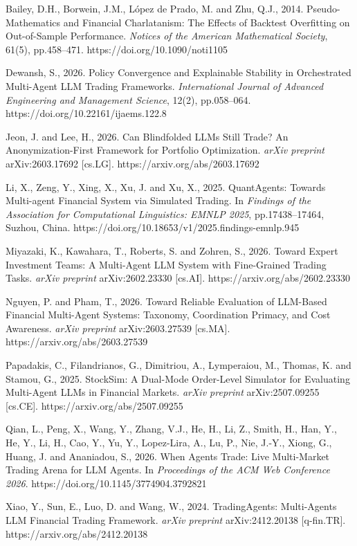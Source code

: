 \documentclass[
]{article}
\begin{document}
Bailey, D.H., Borwein, J.M., López de Prado, M. and Zhu, Q.J., 2014.
Pseudo-Mathematics and Financial Charlatanism: The Effects of Backtest
Overfitting on Out-of-Sample Performance. \emph{Notices of the American
Mathematical Society}, 61(5), pp.458--471.
https://doi.org/10.1090/noti1105

Dewansh, S., 2026. Policy Convergence and Explainable Stability in
Orchestrated Multi-Agent LLM Trading Frameworks. \emph{International
Journal of Advanced Engineering and Management Science}, 12(2),
pp.058--064. https://doi.org/10.22161/ijaems.122.8

Jeon, J. and Lee, H., 2026. Can Blindfolded LLMs Still Trade? An
Anonymization-First Framework for Portfolio Optimization. \emph{arXiv
preprint} arXiv:2603.17692 {[}cs.LG{]}. https://arxiv.org/abs/2603.17692

Li, X., Zeng, Y., Xing, X., Xu, J. and Xu, X., 2025. QuantAgents:
Towards Multi-agent Financial System via Simulated Trading. In
\emph{Findings of the Association for Computational Linguistics: EMNLP
2025}, pp.17438--17464, Suzhou, China.
https://doi.org/10.18653/v1/2025.findings-emnlp.945

Miyazaki, K., Kawahara, T., Roberts, S. and Zohren, S., 2026. Toward
Expert Investment Teams: A Multi-Agent LLM System with Fine-Grained
Trading Tasks. \emph{arXiv preprint} arXiv:2602.23330 {[}cs.AI{]}.
https://arxiv.org/abs/2602.23330

Nguyen, P. and Pham, T., 2026. Toward Reliable Evaluation of LLM-Based
Financial Multi-Agent Systems: Taxonomy, Coordination Primacy, and Cost
Awareness. \emph{arXiv preprint} arXiv:2603.27539 {[}cs.MA{]}.
https://arxiv.org/abs/2603.27539

Papadakis, C., Filandrianos, G., Dimitriou, A., Lymperaiou, M., Thomas,
K. and Stamou, G., 2025. StockSim: A Dual-Mode Order-Level Simulator for
Evaluating Multi-Agent LLMs in Financial Markets. \emph{arXiv preprint}
arXiv:2507.09255 {[}cs.CE{]}. https://arxiv.org/abs/2507.09255

Qian, L., Peng, X., Wang, Y., Zhang, V.J., He, H., Li, Z., Smith, H.,
Han, Y., He, Y., Li, H., Cao, Y., Yu, Y., Lopez-Lira, A., Lu, P., Nie,
J.-Y., Xiong, G., Huang, J. and Ananiadou, S., 2026. When Agents Trade:
Live Multi-Market Trading Arena for LLM Agents. In \emph{Proceedings of
the ACM Web Conference 2026}. https://doi.org/10.1145/3774904.3792821

Xiao, Y., Sun, E., Luo, D. and Wang, W., 2024. TradingAgents:
Multi-Agents LLM Financial Trading Framework. \emph{arXiv preprint}
arXiv:2412.20138 {[}q-fin.TR{]}. https://arxiv.org/abs/2412.20138
\end{document}
